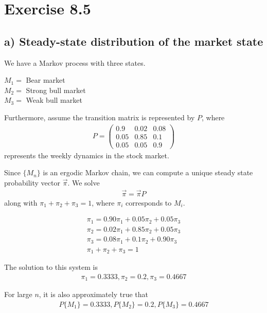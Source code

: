 \documentclass[11pt,letterpaper]{article}
\begin{document}
\section*{Exercise 8.5}

\subsection*{a) Steady-state distribution of the market state}
We have a Markov process with three states.

$M_1 = $ Bear market \\
$M_2 = $ Strong bull market \\
$M_3 = $ Weak bull market

Furthermore, assume the transition matrix is represented by $P$, where
\begin{align*}
P =
	\begin{pmatrix}
	0.9 & 0.02 & 0.08 \\
    0.05 & 0.85 & 0.1 \\
    0.05 & 0.05 & 0.9
	\end{pmatrix}
\end{align*}
represents the weekly dynamics in the stock market.

Since $\{M_n\}$ is an ergodic Markov chain, we can compute a unique steady state probability vector $\vec{\pi}$. We solve
\begin{align*}
\vec{\pi} = \vec{\pi} P
\end{align*}
along with $\pi_1 + \pi_2 + \pi_3= 1$, where $\pi_i$ corresponds to $M_i$.

\begin{align*}
\pi_1 = 0.90\pi_1 + 0.05\pi_2 + 0.05\pi_3 \\
\pi_2 = 0.02\pi_1 + 0.85\pi_2 + 0.05\pi_3 \\
\pi_3 = 0.08\pi_1 + 0.1\pi_2 + 0.90\pi_3 \\
\pi_1 + \pi_2 + \pi_3 = 1
\end{align*}

The solution to this system is
\begin{equation} \label{stock:steady}
	\begin{aligned}
	\pi_1 = 0.3333,
	\pi_2 = 0.2,
    \pi_3 = 0.4667
    \end{aligned}
\end{equation}

For large $n$, it is also approximately true that
\begin{align*}
P\{M_1\} = 0.3333,
P\{M_2\} = 0.2,
P\{M_3\} = 0.4667
\end{align*}
\end{document}
